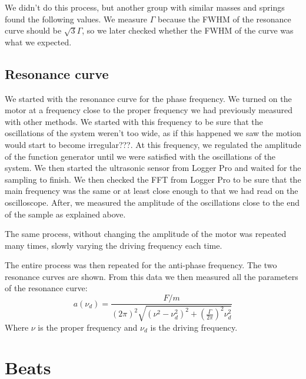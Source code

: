 \documentclass{article}
\begin{document}
We didn't do this process, but another group with similar masses and springs found the following values. 
We measure $\Gamma$ because the FWHM of the resonance curve should be $\sqrt 3 \Gamma$, so we later checked whether the FWHM of the curve was what we expected.

\subsection{Resonance curve}
We started with the resonance curve for the phase frequency. We turned on the motor at a frequency close to the proper frequency we had previously measured with other methods. We started with this frequency to be sure that the oscillations of the system weren't too wide, as if this happened we saw the motion would start to become irregular???. At this frequency, we regulated the amplitude of the function generator until we were satisfied with the oscillations of the system. We then started the ultrasonic sensor from Logger Pro and waited for the sampling to finish. We then checked the FFT from Logger Pro to be sure that the main frequency was the same or at least close enough to that we had read on the oscilloscope. After, we measured the amplitude of the oscillations close to the end of the sample as explained above. 

The same process, without changing the amplitude of the motor was repeated many times, slowly varying the driving frequency each time. 

The entire process was then repeated for the anti-phase frequency. The two resonance curves are shown. 
From this data we then measured all the parameters of the resonance curve: 
\begin{equation}
    a (\nu_d) = \frac{F/m}{  (2\pi)^2
                \sqrt{( \nu^2 - \nu_d^2 )^2 +
                \left ( \frac{\Gamma}{2\pi} \right )^2 \nu_d^2}}
\end{equation}  
Where $\nu$ is the proper frequency and $\nu_d$ is the driving frequency.

\section{Beats}
\end{document}
